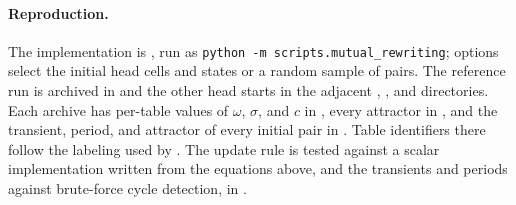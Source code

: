 \documentclass{article}
\begin{document}
\paragraph{Reproduction.}
The implementation is , run as
\texttt{python -m scripts.mutual\_rewriting}; options select the initial head
cells and states or a random sample of pairs.  The reference run is
archived in  and the other head starts in
the adjacent ,
, and 
directories.  Each archive has per-table values of
$\omega$, $\sigma$, and $c$ in , every attractor in
, and the transient, period, and attractor of every
initial pair in .  Table identifiers there follow the
labeling used by .  The update rule is tested
against a scalar implementation written from the equations above, and the
transients and periods against brute-force cycle detection, in
.

\clearpage
\begingroup
\raggedright


\endgroup
\end{document}
